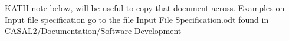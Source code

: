 
\section{\label{sec:examples}}

\subsection{\label{example1}}



KATH note below, will be useful to copy that document across.
Examples on Input file specification go to the file Input File Specification.odt found in CASAL2/Documentation/Software Development

